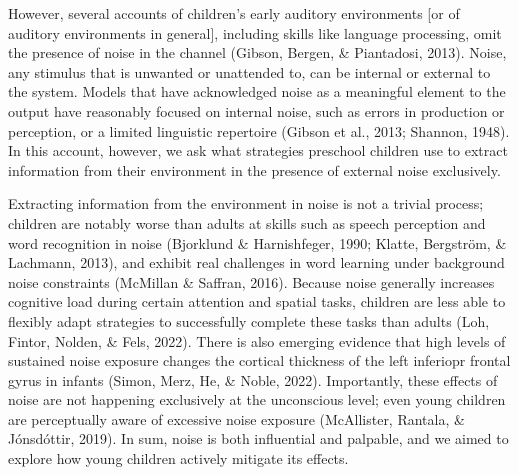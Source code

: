 \documentclass[10pt, letterpaper]{article}
\begin{document}
However, several accounts of children's early auditory environments
{[}or of auditory environments in general{]}, including skills like
language processing, omit the presence of noise in the channel (Gibson,
Bergen, \& Piantadosi, 2013). Noise, any stimulus that is unwanted or
unattended to, can be internal or external to the system. Models that
have acknowledged noise as a meaningful element to the output have
reasonably focused on internal noise, such as errors in production or
perception, or a limited linguistic repertoire (Gibson et al., 2013;
Shannon, 1948). In this account, however, we ask what strategies
preschool children use to extract information from their environment in
the presence of external noise exclusively.

Extracting information from the environment in noise is not a trivial
process; children are notably worse than adults at skills such as speech
perception and word recognition in noise (Bjorklund \& Harnishfeger,
1990; Klatte, Bergström, \& Lachmann, 2013), and exhibit real challenges
in word learning under background noise constraints (McMillan \&
Saffran, 2016). Because noise generally increases cognitive load during
certain attention and spatial tasks, children are less able to flexibly
adapt strategies to successfully complete these tasks than adults (Loh,
Fintor, Nolden, \& Fels, 2022). There is also emerging evidence that
high levels of sustained noise exposure changes the cortical thickness
of the left inferiopr frontal gyrus in infants (Simon, Merz, He, \&
Noble, 2022). Importantly, these effects of noise are not happening
exclusively at the unconscious level; even young children are
perceptually aware of excessive noise exposure (McAllister, Rantala, \&
Jónsdóttir, 2019). In sum, noise is both influential and palpable, and
we aimed to explore how young children actively mitigate its effects.
\end{document}
